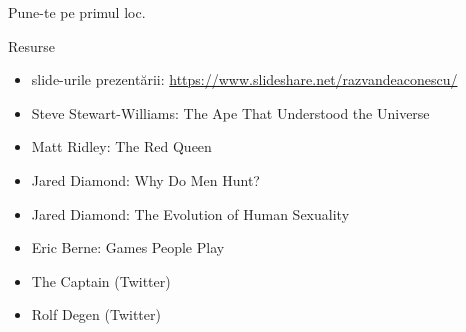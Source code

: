 \documentclass{simple}
\begin{document}
\begin{frame}{}
  \centering
  \pause
  \vspace{0.5cm}
  \Large{Pune-te pe primul loc.} \\
\end{frame}

\begin{frame}{Resurse}
  \begin{itemize}
    \item slide-urile prezentării: \url{https://www.slideshare.net/razvandeaconescu/}
    \item Steve Stewart-Williams: The Ape That Understood the Universe
    \item Matt Ridley: The Red Queen
    \item Jared Diamond: Why Do Men Hunt?
    \item Jared Diamond: The Evolution of Human Sexuality
    \item Eric Berne: Games People Play
    \item The Captain (Twitter)
    \item Rolf Degen (Twitter)
  \end{itemize}
\end{frame}
\end{document}

